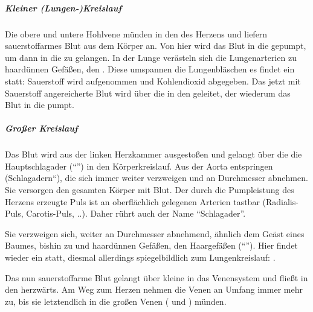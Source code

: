 \gMarried
{\subparagraph{Kleiner (Lungen-)Kreislauf}
Die obere und untere Hohlvene m\"unden in den  des Herzens und liefern sauerstoffarmes Blut aus
dem K\"orper an. Von hier wird das Blut in die  gepumpt, um dann in die  zu
gelangen. In der Lunge ver\"asteln sich die Lungenarterien
zu haard\"unnen Gef\"a{\ss}en, den . Diese
umspannen die Lungenbl\"aschen es findet ein
 statt: Sauerstoff wird aufgenommen und
Kohlendioxid abgegeben. Das jetzt mit Sauerstoff
angereicherte Blut wird \"uber die  in den
 geleitet, der wiederum das Blut in die
 pumpt.

\subparagraph{Gro{\ss}er Kreislauf}
Das Blut wird aus der linken Herzkammer ausgesto{\ss}en und
gelangt \"uber die die Hauptschlagader
("`"') in den
K\"orperkreislauf. Aus der Aorta entspringen 
({\quotedblbase}Schlagadern{\textquotedblleft}), die sich
immer weiter verzweigen und an Durchmesser abnehmen. Sie
versorgen den gesamten K\"orper mit Blut. Der durch die
Pumpleistung des Herzens erzeugte Puls ist an oberfl\"achlich
gelegenen Arterien tastbar (Radialis-Puls, Carotis-Puls, ..).
Daher r\"uhrt auch der Name
"`Schlagader"'.

Sie verzweigen sich, weiter an Durchmesser abnehmend,
\"ahnlich dem Ge\"ast eines Baumes, bishin zu
 und haard\"unnen Gef\"a{\ss}en, den
Haargef\"a{\ss}en ("`"').
Hier findet wieder ein  statt, diesmal
allerdings spiegelbildlich zum Lungenkreislauf:
.

Das nun sauerstoffarme Blut gelangt \"uber kleine
 in das Venensystem und flie{\ss}t in den
 herzw\"arts. Am Weg zum Herzen nehmen die Venen
an Umfang immer mehr zu, bis sie letztendlich in die gro{\ss}en Venen
({\quotedblbase} und ) m\"unden. 
}
{

}


